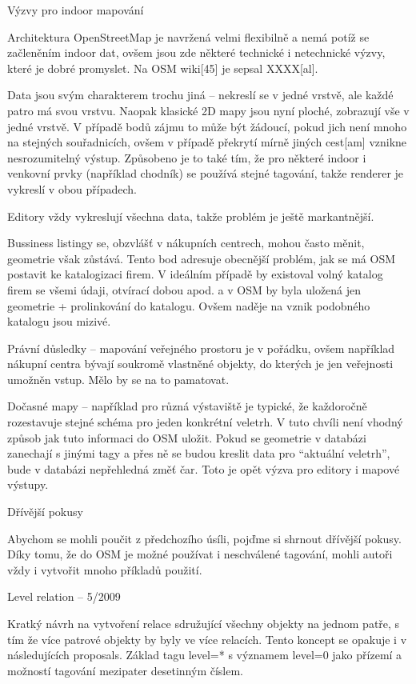 Výzvy pro indoor mapování



Architektura OpenStreetMap je navržená velmi flexibilně a nemá potíž se začleněním indoor dat, ovšem jsou zde některé technické i netechnické výzvy, které je dobré promyslet. Na OSM wiki[45] je sepsal XXXX[al].

Data jsou svým charakterem trochu jiná – nekreslí se v jedné vrstvě, ale každé patro má svou vrstvu. Naopak klasické 2D mapy jsou nyní ploché, zobrazují vše v jedné vrstvě. V případě bodů zájmu to může být žádoucí, pokud jich není mnoho na stejných souřadnicích, ovšem v případě překrytí mírně jiných cest[am] vznikne nesrozumitelný výstup. Způsobeno je to také tím, že pro některé indoor i venkovní prvky (například chodník) se používá stejné tagování, takže renderer je vykreslí v obou případech. 

Editory vždy vykreslují všechna data, takže problém je ještě markantnější.

Bussiness listingy se, obzvlášť v nákupních centrech, mohou často měnit, geometrie však zůstává. Tento bod adresuje obecnější problém, jak se má OSM postavit ke katalogizaci firem. V ideálním případě by existoval volný katalog firem se všemi údaji, otvírací dobou apod. a v OSM by byla uložená jen geometrie + prolinkování do katalogu. Ovšem naděje na vznik podobného katalogu jsou mizivé.

Právní důsledky – mapování veřejného prostoru je v pořádku, ovšem například nákupní centra bývají soukromě vlastněné objekty, do kterých je jen veřejnosti umožněn vstup. Mělo by se na to pamatovat.

Dočasné mapy – například pro různá výstaviště je typické, že každoročně rozestavuje stejné schéma pro jeden konkrétní veletrh. V tuto chvíli není vhodný způsob jak tuto informaci do OSM uložit. Pokud se geometrie v databázi zanechají s jinými tagy a přes ně se budou kreslit data pro “aktuální veletrh”, bude v databázi nepřehledná změť čar. Toto je opět výzva pro editory i mapové výstupy.

Dřívější pokusy



Abychom se mohli poučit z předchozího úsíli, pojďme si shrnout dřívější pokusy. Díky tomu, že do OSM je možné používat i neschválené tagování, mohli autoři vždy i vytvořit mnoho příkladů použití.

Level relation – 5/2009



Kratký návrh na vytvoření relace sdružující všechny objekty na jednom patře, s tím že více patrové objekty by byly ve více relacích. Tento koncept se opakuje i v následujících proposals. Základ tagu level=* s významem level=0 jako přízemí a možností tagování mezipater desetinným číslem.

